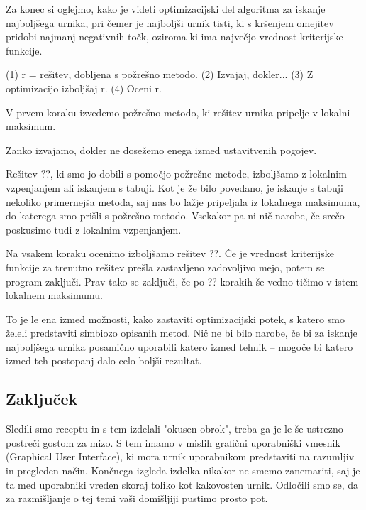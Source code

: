 \documentclass[a4paper,10pt]{article}
\begin{document}
   Za konec si oglejmo, kako je videti optimizacijski del algoritma za iskanje najboljšega
   urnika, pri čemer je najboljši urnik tisti, ki s kršenjem omejitev pridobi najmanj negativnih
   točk, oziroma ki ima največjo vrednost kriterijske funkcije.
   
   (1) r = rešitev, dobljena s požrešno metodo.
   (2) Izvajaj, dokler...
   {
      (3) Z optimizacijo izboljšaj r.
      (4) Oceni r.
   }
   
      V prvem koraku izvedemo požrešno metodo, ki rešitev urnika pripelje v lokalni maksimum.
   
      Zanko izvajamo, dokler ne dosežemo enega izmed ustavitvenih pogojev.
   
      Rešitev ??, ki smo jo dobili s pomočjo požrešne metode, izboljšamo z lokalnim vzpenjanjem
      ali iskanjem s tabuji. Kot je že bilo povedano, je iskanje s tabuji nekoliko primernejša metoda,
      saj nas bo lažje pripeljala iz lokalnega maksimuma, do katerega smo prišli s požrešno metodo.
      Vsekakor pa ni nič narobe, če srečo poskusimo tudi z lokalnim vzpenjanjem.
   
      Na vsakem koraku ocenimo izboljšamo rešitev ??. Če je vrednost kriterijske funkcije
      za trenutno rešitev prešla zastavljeno zadovoljivo mejo, potem se program zaključi. Prav tako
      se zaključi, če po ?? korakih še vedno tičimo v istem lokalnem maksimumu.
   
   To je le ena izmed možnosti, kako zastaviti optimizacijski potek, s katero smo želeli predstaviti
   simbiozo opisanih metod. Nič ne bi bilo narobe, če bi za iskanje najboljšega urnika posamično
   uporabili katero izmed tehnik -- mogoče bi katero izmed teh postopanj dalo celo boljši rezultat.
   
\subsection{   Zaključek}
   
   Sledili smo receptu in s tem izdelali "okusen obrok", treba ga je le še ustrezno postreči
   gostom za mizo. S tem imamo v mislih grafični uporabniški vmesnik (Graphical
   User Interface), ki mora urnik uporabnikom predstaviti na razumljiv in
   pregleden način. Končnega izgleda izdelka nikakor ne smemo zanemariti, saj je ta med uporabniki
   vreden skoraj toliko kot kakovosten urnik. Odločili smo se, da za razmišljanje o tej temi vaši
   domišljiji pustimo prosto pot.
   
\end{document}
